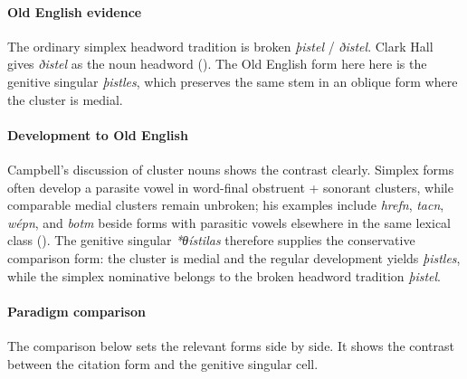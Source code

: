 \documentclass[
  british,
  a4paper,
]{article}
\begin{document}
\paragraph{Old English evidence}\label{old-english-evidence-56}

The ordinary simplex headword tradition is broken \emph{þistel} /
\emph{ðistel}. Clark Hall gives \emph{ðistel} as the noun headword
(). The Old English
form here here is the genitive singular \emph{þistles}, which preserves
the same stem in an oblique form where the cluster is medial.

\paragraph{Development to Old
English}\label{development-to-old-english-56}

Campbell's discussion of cluster nouns shows the contrast clearly.
Simplex forms often develop a parasite vowel in word-final obstruent +
sonorant clusters, while comparable medial clusters remain unbroken; his
examples include \emph{hrefn}, \emph{tacn}, \emph{wépn}, and \emph{botm}
beside forms with parasitic vowels elsewhere in the same lexical class
(). The genitive singular
\emph{*θístilas} therefore supplies the conservative comparison form:
the cluster is medial and the regular development yields \emph{þistles},
while the simplex nominative belongs to the broken headword tradition
\emph{þistel}.

\paragraph{Paradigm comparison}\label{paradigm-comparison-17}

The comparison below sets the relevant forms side by side. It shows the
contrast between the citation form and the genitive singular cell.
\end{document}
